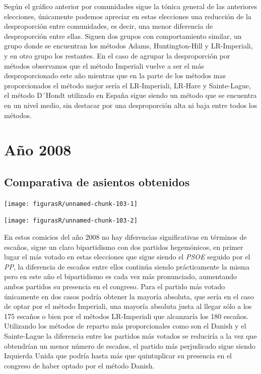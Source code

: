 \documentclass[12pt,a4paper,]{book}
\numberwithin{dummy}{section}
\theoremstyle{ocrenumbox}
\theoremstyle{blacknumex}
\theoremstyle{blacknumbox}
\theoremstyle{ocrenum}
\theoremstyle{ocrenum}
\begin{document}
Según el gráfico anterior por comunidades sigue la tónica general de las
anteriores elecciones, únicamente podemos apreciar en estas elecciones
una reducción de la desproporción entre comunidades, es decir, una menor
diferencia de desproporción entre ellas. Siguen dos grupos con
comportamiento similar, un grupo donde se encuentran los métodos Adams,
Huntington-Hill y LR-Imperiali, y en otro grupo los restantes. En el
caso de agrupar la desproporción por métodos observamos que el método
Imperiali vuelve a ser el más desproporcionado este año mientras que en
la parte de los métodos mas proporcionados el método mejor sería el
LR-Imperiali, LR-Hare y Sainte-Lague, el método D´Hondt utilizado en
España sigue siendo un método que se encuentra en un nivel medio, sin
destacar por una desproporción alta ni baja entre todos los métodos.

\hypertarget{auxf1o-2008}{%
\section{Año 2008}\label{auxf1o-2008}}

\hypertarget{comparativa-de-asientos-obtenidos-9}{%
\subsection{Comparativa de asientos
obtenidos}\label{comparativa-de-asientos-obtenidos-9}}

\begin{center}\texttt{[image: figurasR/unnamed-chunk-103-1]} \end{center}

\begin{center}\texttt{[image: figurasR/unnamed-chunk-103-2]} \end{center}

En estos comicios del año 2008 no hay diferencias significativas en
términos de escaños, sigue un claro bipartidismo con dos partidos
hegemónicos, en primer lugar el más votado en estas elecciones que sigue
siendo el \emph{PSOE} seguido por el \emph{PP}, la diferencia de escaños
entre ellos continúa siendo prácticamente la misma pero en este año el
bipartidismo es cada vez más pronunciado, aumentando ambos partidos su
presencia en el congreso. Para el partido más votado únicamente en dos
casos podría obtener la mayoría absoluta, que sería en el caso de optar
por el método Imperiali, una mayoría absoluta justa al llegar sólo a los
175 escaños o bien por el métodos LR-Imperiali que alcanzaría los 180
escaños. Utilizando los métodos de reparto más proporcionales como son
el Danish y el Sainte-Lague la diferencia entre los partidos más votados
se reduciría a la vez que obtendrían un menor número de escaños, el
partido más perjudicado sigue siendo Izquierda Unida que podría hasta
más que quintuplicar su presencia en el congreso de haber optado por el
método Danish.
\end{document}

